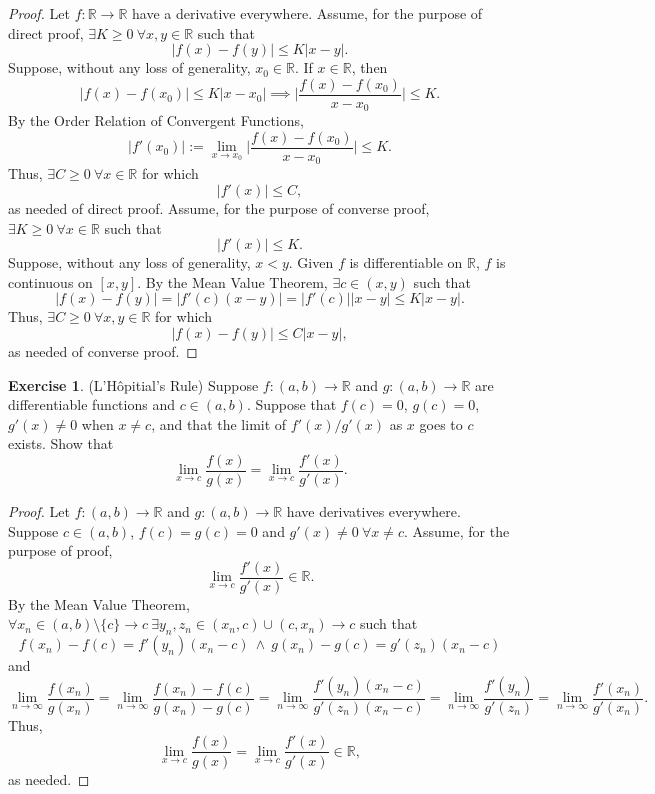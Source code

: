 \documentclass[12pt]{article}
\theoremstyle{definition}
\newtheorem{exercise}{Exercise}
\begin{document}
\begin{proof}
    Let \(f : \mathbb{R} \to \mathbb{R}\) have a derivative everywhere. Assume, for the purpose of direct proof, \(\exists K \geq 0 \ \forall x,y \in \mathbb{R}\) such that
    \[
        \vert f(x) - f(y) \vert \leq K \vert x - y \vert. 
    \]
    Suppose, without any loss of generality, \(x_0 \in \mathbb{R}\). If \(x \in \mathbb{R}\), then
    \[
        \vert f(x) - f(x_0) \vert \leq K \vert x - x_0 \vert \implies \bigg\vert \frac{f(x) - f(x_0)}{x - x_0} \bigg\vert \leq K.
    \]
    By the Order Relation of Convergent Functions,
    \[
        \vert f'(x_0) \vert := \lim_{x \to x_0} \bigg\vert \frac{f(x) - f(x_0)}{x - x_0} \bigg\vert \leq K.
    \]
    Thus, \(\exists C \geq 0 \ \forall x \in \mathbb{R}\) for which
    \[
        \vert f'(x) \vert \leq C,
    \]
    as needed of direct proof. Assume, for the purpose of converse proof, \(\exists K \geq 0 \ \forall x \in \mathbb{R}\) such that
    \[
        \vert f'(x) \vert \leq K.
    \]
    Suppose, without any loss of generality, \(x < y\). Given \(f\) is differentiable on \(\mathbb{R}\), \(f\) is continuous on \([x, y]\). By the Mean Value Theorem, \(\exists c \in (x, y)\) such that
    \[
        \vert f(x) - f(y) \vert = \vert f'(c) (x - y) \vert = \vert f'(c) \vert \vert x - y \vert \leq K \vert x - y \vert.
    \]
    Thus, \(\exists C \geq 0 \ \forall x,y \in \mathbb{R}\) for which
    \[
        \vert f(x) - f(y) \vert \leq C \vert x - y \vert,
    \]
    as needed of converse proof.
\end{proof}

\begin{exercise}
    (L'Hôpitial's Rule) Suppose \(f : (a, b) \to \mathbb{R}\) and \(g : (a, b) \to \mathbb{R}\) are differentiable functions and \(c \in (a, b)\). Suppose that \(f(c) = 0\), \(g(c) = 0\), \(g'(x) \neq 0\) when \(x \neq c\), and that the limit of \(f'(x) / g'(x)\) as \(x\) goes to \(c\) exists. Show that 
    \[
        \lim_{x \to c}\frac{f(x)}{g(x)} = \lim_{x \to c}\frac{f'(x)}{g'(x)}.
    \]
\end{exercise}

\begin{proof}
    Let \(f : (a, b) \to \mathbb{R}\) and \(g : (a, b) \to \mathbb{R}\) have derivatives everywhere. Suppose \(c \in (a, b)\), \(f(c) = g(c) = 0\) and \(g'(x) \neq 0 \ \forall x \neq c\). Assume, for the purpose of proof, 
    \[
        \lim_{x \to c}\frac{f'(x)}{g'(x)} \in \mathbb{R}.
    \]
    By the Mean Value Theorem, \(\forall x_n \in (a, b) \setminus \{c\} \to c \ \exists y_n, z_n \in (x_n, c) \cup (c, x_n) \to c\) such that
    \[
        f(x_n) - f(c) = f'(y_n)(x_n - c) \ \land \ g(x_n) - g(c) = g'(z_n)(x_n - c)
    \]
    and
    \[
        \lim_{n \to \infty}\frac{f(x_n)}{g(x_n)} = \lim_{n \to \infty}\frac{f(x_n) - f(c)}{g(x_n) - g(c)} = \lim_{n \to \infty}\frac{f'(y_n)(x_n - c)}{g'(z_n)(x_n - c)} = \lim_{n \to \infty}\frac{f'(y_n)}{g'(z_n)} = \lim_{n \to \infty}\frac{f'(x_n)}{g'(x_n)}.
    \]
    Thus,
    \[
        \lim_{x \to c}\frac{f(x)}{g(x)} = \lim_{x \to c}\frac{f'(x)}{g'(x)} \in \mathbb{R},
    \]
    as needed.
\end{proof}
\end{document}
